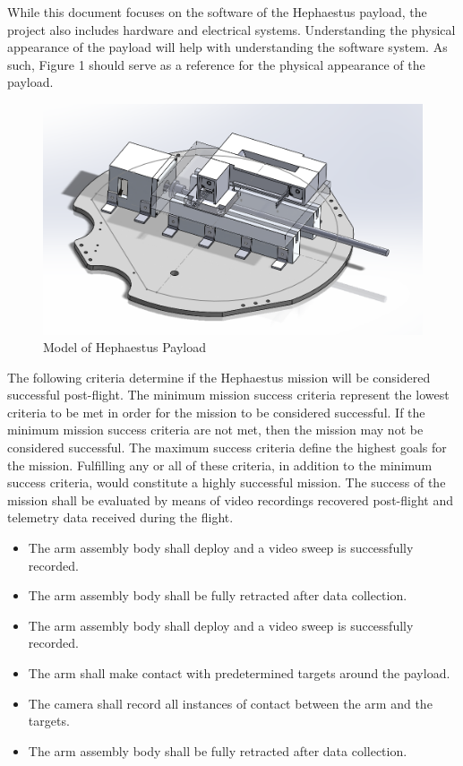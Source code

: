 While this document focuses on the software of the Hephaestus payload, the project also includes hardware
 and electrical systems. 
Understanding the physical appearance of the payload will help with understanding the software system. 
As such, Figure 1 should serve as a reference for the physical appearance of the payload.
\begin{figure}
\includegraphics[scale=.5]{./images/img2}
\caption{Model of Hephaestus Payload}
\end{figure}

The following criteria determine if the Hephaestus mission will be considered successful post-flight.
The minimum mission success criteria represent the lowest criteria to be met in order for the mission to be considered successful.
If the minimum mission success criteria are not met, then the mission may not be considered successful.
The maximum success criteria define the highest goals for the mission.
Fulfilling any or all of these criteria, in addition to the minimum success criteria, would constitute a highly successful mission.
The success of the mission shall be evaluated by means of video recordings recovered post-flight and telemetry data received during the flight.

\begin{itemize}
\item{The arm assembly body shall deploy and a video sweep is successfully recorded.}
\item{The arm assembly body shall be fully retracted after data collection.}
\end{itemize}

\begin{itemize}
\item{The arm assembly body shall deploy and a video sweep is successfully recorded.}
\item{The arm shall make contact with predetermined targets around the payload.}
\item{The camera shall record all instances of contact between the arm and the targets.}
\item{The arm assembly body shall be fully retracted after data collection.}
\end{itemize}

